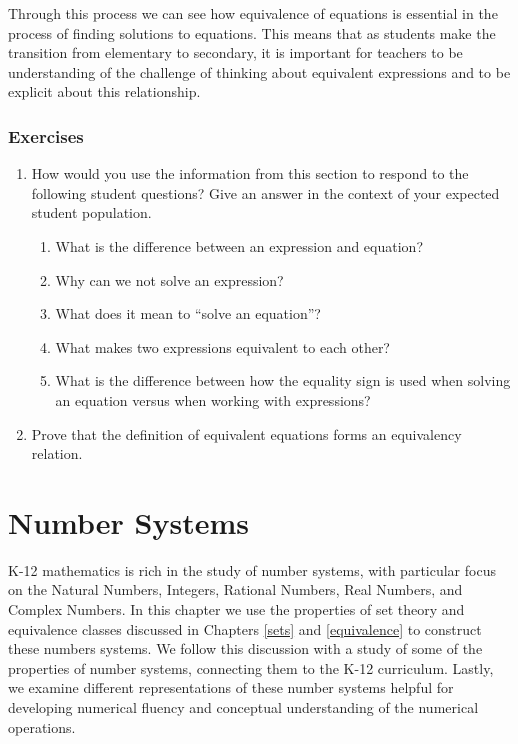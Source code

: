 \documentclass[
]{book}
\providecommand{\tightlist}{%
  \setlength{\itemsep}{0pt}\setlength{\parskip}{0pt}}
\theoremstyle{definition}
\theoremstyle{definition}
\theoremstyle{definition}
\theoremstyle{definition}
\theoremstyle{remark}
\begin{document}
Through this process we can see how equivalence of equations is essential in the process of finding solutions to equations. This means that as students make the transition from elementary to secondary, it is important for teachers to be understanding of the challenge of thinking about equivalent expressions and to be explicit about this relationship.

\hypertarget{exercises-9}{%
\subsection{Exercises}\label{exercises-9}}

\begin{enumerate}
\def\labelenumi{\arabic{enumi}.}
\tightlist
\item
  How would you use the information from this section to respond to the following student questions? Give an answer in the context of your expected student population.

  \begin{enumerate}
  \def\labelenumii{\alph{enumii}.}
  \tightlist
  \item
    What is the difference between an expression and equation?
  \item
    Why can we not solve an expression?
  \item
    What does it mean to ``solve an equation''?
  \item
    What makes two expressions equivalent to each other?
  \item
    What is the difference between how the equality sign is used when solving an equation versus when working with expressions?
  \end{enumerate}
\item
  Prove that the definition of equivalent equations forms an equivalency relation.
\end{enumerate}

\hypertarget{number}{%
\chapter{Number Systems}\label{number}}

K-12 mathematics is rich in the study of number systems, with particular focus on the Natural Numbers, Integers, Rational Numbers, Real Numbers, and Complex Numbers. In this chapter we use the properties of set theory and equivalence classes discussed in Chapters \ref{sets} and \ref{equivalence} to construct these numbers systems. We follow this discussion with a study of some of the properties of number systems, connecting them to the K-12 curriculum. Lastly, we examine different representations of these number systems helpful for developing numerical fluency and conceptual understanding of the numerical operations.
\end{document}
